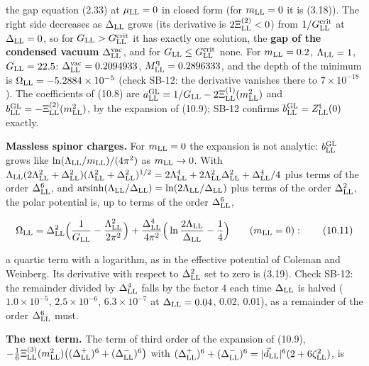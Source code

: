 \documentclass[
  10pt,
]{article}
\begin{document}
the gap equation (2.33) at \(\mu_{\rm LL}=0\) in closed form (for
\(m_{\rm LL}=0\) it is (3.18)). The right side decreases as
\(\Delta_{\rm LL}\) grows (its derivative is \(2\Xi^{(2)}_{\rm LL}<0\))
from \(1/G^{\rm crit}_{\rm LL}\) at \(\Delta_{\rm LL}=0\), so for
\(G_{\rm LL}>G^{\rm crit}_{\rm LL}\) it has exactly one solution, the
\textbf{gap of the condensed vacuum} \(\Delta^{\rm vac}_{\rm LL}\), and
for \(G_{\rm LL}\le G^{\rm crit}_{\rm LL}\) none. For
\(m_{\rm LL}=0.2\), \(\Lambda_{\rm LL}=1\), \(G_{\rm LL}=22.5\):
\(\Delta^{\rm vac}_{\rm LL}=0.2094933\),
\(M^{\rm q}_{\rm LL}=0.2896333\), and the depth of the minimum is
\(\Omega_{\rm LL}=-5.2884\times10^{-5}\) (check SB-12: the derivative
vanishes there to \(7\times10^{-18}\)). The coefficients of (10.8) are
\(a^{\rm GL}_{\rm LL}=1/G_{\rm LL}-2\Xi^{(1)}_{\rm LL}(m_{\rm LL}^2)\)
and \(b^{\rm GL}_{\rm LL}=-\Xi^{(2)}_{\rm LL}(m_{\rm LL}^2)\), by the
expansion of (10.9); SB-12 confirms
\(b^{\rm GL}_{\rm LL}=Z^{\rm t}_{\rm LL}(0)\) exactly.

\textbf{Massless spinor charges.} For \(m_{\rm LL}=0\) the expansion is
not analytic: \(b^{\rm GL}_{\rm LL}\) grows like
\(\ln(\Lambda_{\rm LL}/m_{\rm LL})/(4\pi^2)\) as \(m_{\rm LL}\to0\).
With
\(\Lambda_{\rm LL}(2\Lambda_{\rm LL}^2+\Delta_{\rm LL}^2)(\Lambda_{\rm LL}^2+\Delta_{\rm LL}^2)^{1/2}=2\Lambda_{\rm LL}^4+2\Lambda_{\rm LL}^2\Delta_{\rm LL}^2+\Delta_{\rm LL}^4/4\)
plus terms of the order \(\Delta_{\rm LL}^6\), and
\(\mathrm{arsinh}(\Lambda_{\rm LL}/\Delta_{\rm LL})=\ln(2\Lambda_{\rm LL}/\Delta_{\rm LL})\)
plus terms of the order \(\Delta_{\rm LL}^2\), the polar potential is,
up to terms of the order \(\Delta_{\rm LL}^6\),

\[\Omega_{\rm LL}=\Delta_{\rm LL}^2\Big(\frac1{G_{\rm LL}}-\frac{\Lambda_{\rm LL}^2}{2\pi^2}\Big)+\frac{\Delta_{\rm LL}^4}{4\pi^2}\Big(\ln\frac{2\Lambda_{\rm LL}}{\Delta_{\rm LL}}-\frac14\Big)\qquad(m_{\rm LL}=0):\tag{10.11}\]

a quartic term with a logarithm, as in the effective potential of
Coleman and Weinberg. Its derivative with respect to
\(\Delta_{\rm LL}^2\) set to zero is (3.19). Check SB-12: the remainder
divided by \(\Delta_{\rm LL}^4\) falls by the factor 4 each time
\(\Delta_{\rm LL}\) is halved (\(1.0\times10^{-5}\),
\(2.5\times10^{-6}\), \(6.3\times10^{-7}\) at \(\Delta_{\rm LL}=0.04\),
0.02, 0.01), as a remainder of the order \(\Delta_{\rm LL}^6\) must.

\textbf{The next term.} The term of third order of the expansion of
(10.9),
\(-\tfrac16\Xi^{(3)}_{\rm LL}(m_{\rm LL}^2)\big((\Delta^+_{\rm LL})^6+(\Delta^-_{\rm LL})^6\big)\)
with
\((\Delta^+_{\rm LL})^6+(\Delta^-_{\rm LL})^6=\lvert\vec d_{\rm LL}\rvert^6(2+6\zeta_{\rm LL}^2)\),
is
\end{document}
